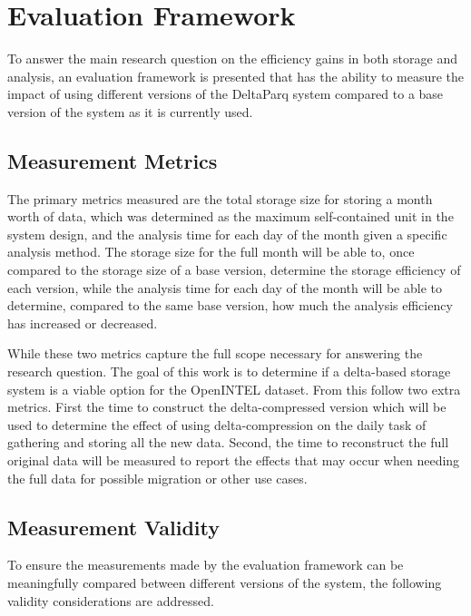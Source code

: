 \section{Evaluation Framework}

To answer the main research question on the efficiency gains in both storage and analysis, an 
evaluation framework is presented that has the ability to measure the impact of using different 
versions of the DeltaParq system compared to a base version of the system as it is currently 
used.

\subsection{Measurement Metrics}

The primary metrics measured are the total storage size for storing a month worth of data, which 
was determined as the maximum self-contained unit in the system design, and the analysis time for each 
day of the month given a specific analysis method. The storage size for the full month will be able to,
once compared to the storage size of a base version, determine the storage efficiency of each version, 
while the analysis time for each day of the month will be able to determine, compared to the same base 
version, how much the analysis efficiency has increased or decreased. 

While these two metrics capture the full scope necessary for answering the research question. The goal of this work 
is to determine if a delta-based storage system is a viable option for the OpenINTEL dataset. From this 
follow two extra metrics. First the time to construct the delta-compressed version which will be 
used to determine the effect of using delta-compression on the daily task of gathering and storing all the new 
data. Second, the time to reconstruct the full original data will be measured to report the effects that may 
occur when needing the full data for possible migration or other use cases.

\subsection{Measurement Validity}

To ensure the measurements made by the evaluation framework can be meaningfully compared between 
different versions of the system, the following validity considerations are addressed. 


